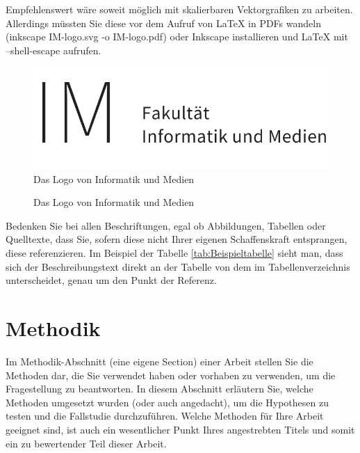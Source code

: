 Empfehlenswert wäre soweit möglich mit skalierbaren Vektorgrafiken zu arbeiten. Allerdings müssten Sie diese vor dem Aufruf von LaTeX in PDFs wandeln (inkscape IM-logo.svg -o IM-logo.pdf) oder Inkscape installieren und LaTeX mit --shell-escape aufrufen.

\begin{figure}[!t]
    \centering
    \includegraphics[scale=0.6]{Bilder/logos/IM-logo}
    \caption{Das Logo von Informatik und Medien }
\end{figure}

\begin{figure}[!t]
    \centering
    
    \caption{Das Logo von Informatik und Medien }
\end{figure}

Bedenken Sie bei allen Beschriftungen, egal ob Abbildungen, Tabellen oder Quelltexte, dass Sie, sofern diese nicht Ihrer eigenen Schaffenskraft entsprangen,
diese referenzieren. Im Beispiel der Tabelle \ref{tab:Beispieltabelle} sieht man, dass sich der Beschreibungstext direkt an der Tabelle von dem im Tabellenverzeichnis unterscheidet,
genau um den Punkt der Referenz.

\section{Methodik}

Im Methodik-Abschnitt (eine eigene Section) einer Arbeit stellen Sie die Methoden dar, die Sie verwendet haben oder vorhaben zu verwenden, um die Fragestellung zu beantworten. 
In diesem Abschnitt erläutern Sie, welche Methoden umgesetzt wurden (oder auch angedacht), um die Hypothesen zu testen und die Fallstudie durchzuführen. 
Welche Methoden für Ihre Arbeit geeignet sind, ist auch ein wesentlicher Punkt Ihres angestrebten Titels und somit ein zu bewertender Teil dieser Arbeit. 

